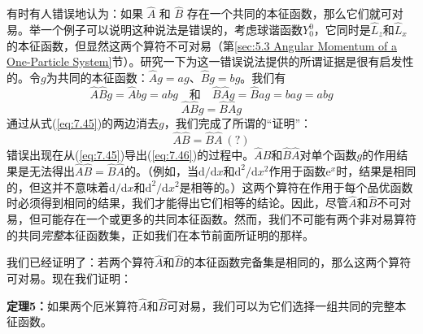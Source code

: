     有时有人错误地认为：如果 $\hat{A}$ 和 $\hat{B}$ 存在一个共同的本征函数，那么它们就可对易。举一个例子可以说明这种说法是错误的，考虑球谐函数$Y_0^0$，它同时是$\hat{L}_z$和$\hat{L}_x$的本征函数，但显然这两个算符不可对易（第\ref{sec:5.3 Angular Momentum of a One-Particle System}节）。研究一下为这一错误说法提供的所谓证据是很有启发性的。令$g$为共同的本征函数：$\hat{A}g = ag$、$\hat{B}g = bg$。我们有
    \begin{equation*}
        \hat{A}\hat{B}g = \hat{A}bg = abg \quad \text{和} \quad \hat{B}\hat{A}g = \hat{B}ag = bag = abg
    \end{equation*}
    \begin{equation}
        \hat{A}\hat{B}g = \hat{B}\hat{A}g
        \label{eq:7.45}
    \end{equation}
    通过从式(\ref{eq:7.45})的两边消去$g$，我们完成了所谓的“证明”：
    \begin{equation}
        \hat{A}\hat{B} = \hat{B}\hat{A}\:(?)
        \label{eq:7.46}
    \end{equation}
    错误出现在从(\ref{eq:7.45})导出(\ref{eq:7.46})的过程中。$\hat{A}\hat{B}$和$\hat{B}\hat{A}$对单个函数$g$的作用结果是无法得出$\hat{A}\hat{B} = \hat{B}\hat{A}$的。（例如，当$\mathrm{d}/\mathrm{d}x$和$\mathrm{d}^2/\mathrm{d}x^2$作用于函数$\mathrm{e}^x$时，结果是相同的，但这并不意味着$\mathrm{d}/\mathrm{d}x$和$\mathrm{d}^2/\mathrm{d}x^2$是相等的。）这两个算符在作用于每个品优函数时必须得到相同的结果，我们才能得出它们相等的结论。因此，尽管$\hat{A}$和$\hat{B}$不可对易，但可能存在一个或更多的共同本征函数。然而，我们不可能有两个非对易算符的共同\textit{完整}本征函数集，正如我们在本节前面所证明的那样。

    我们已经证明了：若两个算符$\hat{A}$和$\hat{B}$的本征函数完备集是相同的，那么这两个算符可对易。现在我们证明：
    \begin{center}
        \parbox{0.8\textwidth}{
            \textbf{定理5：}如果两个厄米算符$\hat{A}$和$\hat{B}$可对易，我们可以为它们选择一组共同的完整本征函数。
        }
    \end{center}

